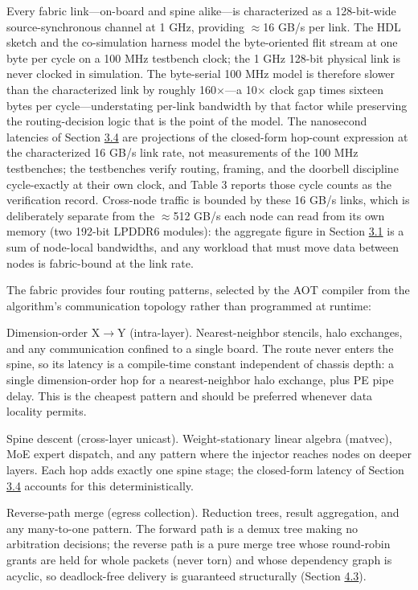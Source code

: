 \documentclass[12pt,onecolumn]{article}
\begin{document}
Every fabric link---on-board and spine alike---is characterized as a 128-bit-wide source-synchronous channel at 1 GHz, providing $\approx$16 GB/s per link. The HDL sketch and the co-simulation harness model the byte-oriented flit stream at one byte per cycle on a 100 MHz testbench clock; the 1 GHz 128-bit physical link is never clocked in simulation. The byte-serial 100 MHz model is therefore slower than the characterized link by roughly 160$\times$---a 10$\times$ clock gap times sixteen bytes per cycle---understating per-link bandwidth by that factor while preserving the routing-decision logic that is the point of the model. The nanosecond latencies of Section \hyperref[sec:3.4]{3.4} are projections of the closed-form hop-count expression at the characterized 16 GB/s link rate, not measurements of the 100 MHz testbenches; the testbenches verify routing, framing, and the doorbell discipline cycle-exactly at their own clock, and Table 3 reports those cycle counts as the verification record. Cross-node traffic is bounded by these 16 GB/s links, which is deliberately separate from the $\approx$512 GB/s each node can read from its own memory (two 192-bit LPDDR6 modules): the aggregate figure in Section \hyperref[sec:3.1]{3.1} is a sum of node-local bandwidths, and any workload that must move data between nodes is fabric-bound at the link rate.

The fabric provides four routing patterns, selected by the AOT compiler from the algorithm's communication topology rather than programmed at runtime:

Dimension-order X$\rightarrow$Y (intra-layer). Nearest-neighbor stencils, halo exchanges, and any communication confined to a single board. The route never enters the spine, so its latency is a compile-time constant independent of chassis depth: a single dimension-order hop for a nearest-neighbor halo exchange, plus PE pipe delay. This is the cheapest pattern and should be preferred whenever data locality permits.

Spine descent (cross-layer unicast). Weight-stationary linear algebra (matvec), MoE expert dispatch, and any pattern where the injector reaches nodes on deeper layers. Each hop adds exactly one spine stage; the closed-form latency of Section \hyperref[sec:3.4]{3.4} accounts for this deterministically.

Reverse-path merge (egress collection). Reduction trees, result aggregation, and any many-to-one pattern. The forward path is a demux tree making no arbitration decisions; the reverse path is a pure merge tree whose round-robin grants are held for whole packets (never torn) and whose dependency graph is acyclic, so deadlock-free delivery is guaranteed structurally (Section \hyperref[sec:4.3]{4.3}).
\end{document}

